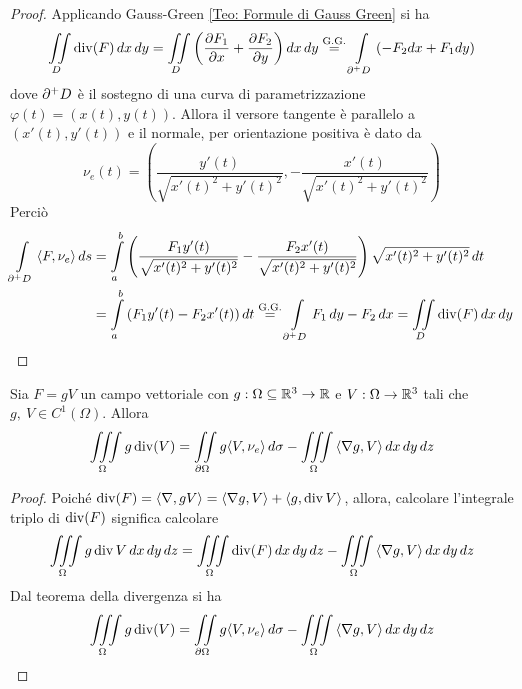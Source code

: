  \begin{proof}
     Applicando Gauss-Green \eqref{Teo: Formule di Gauss Green} si ha
     \begin{equation*}
     \iint\limits_{D}{\operatorname{div}(F)}\,dx\,dy=\iint\limits_{D}{\left(\frac{\partial F_1}{\partial x}+ \frac{\partial F_2}{\partial y}\right)}\,dx\,dy \overset{\text{G.G.}}{=} \int\limits_{\partial^+ D}{(-F_2 dx + F_1 dy)}
     \end{equation*}
     dove $\partial^+ D$ è il sostegno di una curva di parametrizzazione $\varphi(t)= (x(t), y(t))$. Allora il versore tangente è parallelo a $(x'(t), y'(t))$ e il normale, per orientazione positiva è dato da 
     \begin{equation*}
         \nu_e(t)=\left(\frac{y'(t)}{\sqrt{x'(t)^2+y'(t)^2}}, -\frac{x'(t)}{\sqrt{x'(t)^2+y'(t)^2}} \right)
     \end{equation*}
     Perciò
     \begin{equation*}
         \begin{aligned}
             \int\limits_{\partial^+ D}{\langle F, \nu_e \rangle}\,ds &= \int\limits_{a}^{b}{\left(\frac{F_1y'(t)}{\sqrt{x'(t)^2+y'(t)^2}} -\frac{F_2x'(t)}{\sqrt{x'(t)^2+y'(t)^2}} \right)\sqrt{x'(t)^2+y'(t)^2}}\, dt\\
             &=\int\limits_{a}^{b}{(F_1 y'(t)- F_2 x'(t))}\, dt \overset{\text{G.G.}}{=} \int\limits_{\partial^+ D}{F_1\,dy- F_2\,dx} = \iint\limits_{D}{\operatorname{div}(F)}\,dx\,dy
         \end{aligned}
     \end{equation*}
\end{proof}
\begin{corollary}
    Sia $F= gV$ un campo vettoriale con $g:\Omega \subseteq \mathbb{R}^3\to \mathbb{R}$ e $V: \Omega \to \mathbb{R}^3$ tali che $g,\ V \in C^1(\Omega)$. Allora 
    \begin{equation*}
    \iiint\limits_{\Omega}{g \operatorname{div}(V)}= \iint\limits_{\partial \Omega}{g \langle V, \nu_e \rangle}\, d\sigma - \iiint\limits_{\Omega}{\langle \nabla g, V \rangle}\,dx\,dy\,dz
    \end{equation*}
\end{corollary}
\begin{proof}
Poiché $\operatorname{div}(F)= \langle \nabla, gV \rangle = \langle \nabla g, V \rangle + \langle g, \operatorname{div} V \rangle$, allora, calcolare l'integrale triplo di $\operatorname{div}(F)$ significa calcolare
    \begin{equation*}
      \iiint\limits_\Omega{g \operatorname{div}V}\,dx\,dy\,dz = \iiint\limits_{\Omega} {\operatorname{div}(F)}\,dx\,dy\,dz - \iiint\limits_{\Omega} {\langle \nabla g, V \rangle}\,dx\,dy\,dz
    \end{equation*}
    Dal teorema della divergenza si ha 
    \begin{equation*}
    \iiint\limits_{\Omega}{g \operatorname{div}(V)}= \iint\limits_{\partial \Omega}{g \langle V, \nu_e \rangle}\, d\sigma - \iiint\limits_{\Omega}{\langle \nabla g, V \rangle}\,dx\,dy\,dz
    \end{equation*}
\end{proof}